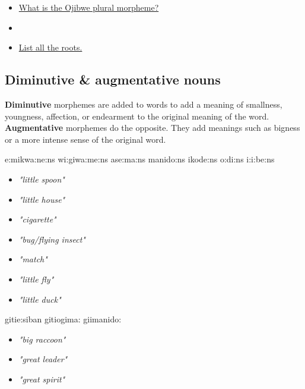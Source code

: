 \documentclass[a4paper,11pt]{article}
\begin{document}
\vspace{1cm}

\begin{itemize}
\item \underline{What is the Ojibwe plural morpheme?}
\item[] 
\item \underline{List all the roots.}
\end{itemize}

\pagebreak



\subsection{Diminutive \& augmentative nouns}

\textbf{Diminutive} morphemes are added to words to add a meaning of smallness, youngness, affection, or endearment to the original meaning of the word. \textbf{Augmentative} morphemes do the opposite. They add meanings such as bigness or a more intense sense of the original word. 

\vspace{1cm}

\begin{multicols}{2}
\begin{exe}
\ex e:mikwa:ne:ns 
\ex wi:giwa:me:ns 
\ex ase:ma:ns 
\ex manido:ns 
\ex ikode:ns
\ex o:d{\textyogh}i:ns 
\ex {\textyogh}i:i:be:ns 
\end{exe}
\columnbreak
\begin{itemize}
\item[] \textit{"little spoon"}
\item[] \textit{"little house"}
\item[] \textit{"cigarette"}
\item[] \textit{"bug/flying insect"}
\item[] \textit{"match"}
\item[] \textit{"little fly"}
\item[] \textit{"little duck"}
\end{itemize}
\end{multicols}

\begin{multicols}{2}
\begin{exe}
\ex gitie:siban 
\ex git{\textyogh}iogima: 
\ex giimanido: 
\end{exe}
\columnbreak
\begin{itemize}
\item[] \textit{"big raccoon"}
\item[] \textit{"great leader"}
\item[] \textit{"great spirit"}
\end{itemize}
\end{multicols}
\end{document}
